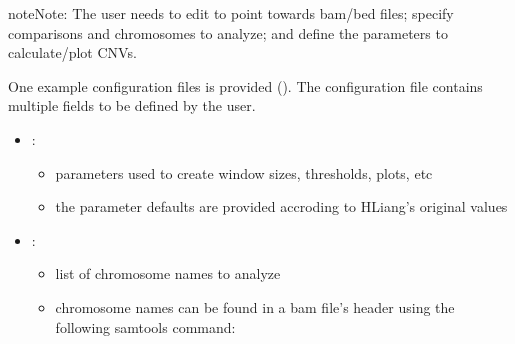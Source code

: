 \documentclass[letterpaper,10pt,english]{sphinxhowto}
\begin{document}
\begin{sphinxVerbatim}[commandchars=\\\{\}]
     
     
     
     
\end{sphinxVerbatim}

\begin{sphinxadmonition}{note}{Note:}
\sphinxAtStartPar
The user needs to edit  to point towards bam/bed files; specify comparisons and chromosomes to analyze; and define the parameters to calculate/plot CNVs.
\end{sphinxadmonition}

\sphinxAtStartPar
One example configuration files is provided (). The configuration file  contains multiple fields to be defined by the user.
\begin{itemize}
\item {} 
\sphinxAtStartPar
{}:
\begin{itemize}
\item {} 
\sphinxAtStartPar
parameters used to create window sizes, thresholds, plots, etc

\item {} 
\sphinxAtStartPar
the parameter defaults are provided accroding to HLiang’s original values

\end{itemize}

\item {} 
\sphinxAtStartPar
{}:
\begin{itemize}
\item {} 
\sphinxAtStartPar
list of chromosome names to analyze

\item {} 
\sphinxAtStartPar
chromosome names can be found in a bam file’s header using the following samtools command:

\end{itemize}

\end{itemize}
\end{document}
